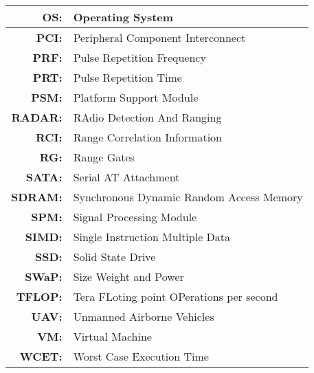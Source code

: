 \begin{center}
\begin{longtable}{|>{\bfseries}rl|}
OS: & Operating System \\ \hline
PCI: & Peripheral Component Interconnect \\ \hline
PRF: & Pulse Repetition Frequency  \\ \hline
PRT: & Pulse Repetition Time \\ \hline
PSM: & Platform Support Module \\ \hline
RADAR: & RAdio Detection And Ranging \\ \hline 
RCI: & Range Correlation Information \\ \hline
RG: & Range Gates \\ \hline
SATA: & Serial AT Attachment \\ \hline
SDRAM: & Synchronous Dynamic Random Access Memory  \\ \hline
SPM: & Signal Processing Module \\ \hline
SIMD: & Single Instruction Multiple Data \\ \hline
SSD: & Solid State Drive \\ \hline
SWaP: & Size Weight and Power \\ \hline
TFLOP: & Tera FLoting point OPerations per second \\ \hline
UAV: & Unmanned Airborne Vehicles \\ \hline 
VM: & Virtual Machine \\ \hline
WCET: &  Worst Case Execution Time \\ \hline

\end{longtable}
\end{center}
